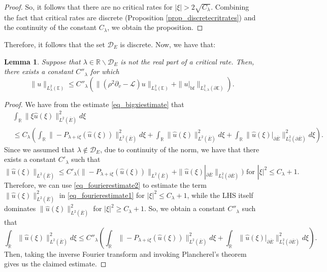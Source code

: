 \documentclass[10pt, a4paper]{article}
\theoremstyle{plain}%
\newtheorem{lem}[theorem]{Lemma}
\theoremstyle{definition}
\numberwithin{figure}{section}
\numberwithin{equation}{section}
\newcommand{\bR}{\mathbb{R}}
\newcommand{\bE}{\mathbb{E}}
\newcommand{\pa}{\partial}
\newcommand{\cL}{\mathcal{L}}
\newcommand{\oE}{{\overline{E}}}
\newcommand{\botf}{\textrm{bf}}
\newcommand{\cD}{\mathcal{D}}
\begin{document}
\begin{proof}
	
	So, it follows that there are no critical rates for $|\xi|>2\sqrt{C_\lambda}$. Combining the fact that critical rates are discrete (Proposition \ref{prop_discretecritrates}) and the continuity of the constant $C_\lambda$, we obtain the proposition. 
\end{proof}
Therefore, it follows that the set $\cD_E$ is discrete. Now, we have that:

\begin{lem}\label{lem_fredholmnoncritical}
	Suppose that $\lambda\in \bR \backslash \cD_E$ is not the real part of a critical rate. Then, there exists a constant $C''_\lambda$ for which \[
	\|u\|_{L^2_{\lambda}(\bE)} \leq C''_\lambda(\|(\rho^2\pa_v - \cL)u\|_{L^2_{\lambda}(\bE)}  +\|u|_{\botf}\|_{L^2_{1,\lambda}(\pa\bE)}).
	\]  
\end{lem}
\begin{proof}
	We have from the estimate \eqref{eq_bigxiestimate} that 
	\begin{equation}\label{eq_fourierestimate1}
		\begin{split}
		&\int_{\bR}\|\xi\hat{u}(\xi)\|^2_{L^2(\oE)}d\xi\\
		&\leq C_\lambda\left(\int_{\bR}\|-P_{\lambda+i\xi}(\hat{u}(\xi))\|^2_{L^2(\oE)}d\xi + \int_{\bR}\|\hat{u}(\xi)\|^2_{L^2(\oE)}d\xi + \int_{\bR}\|\hat{u}(\xi)|_{\pa\oE}\|^2_{L^2_1(\pa\oE)}d\xi\right).
		\end{split}
	\end{equation}
	Since we assumed that $\lambda \not \in \cD_E$, due to continuity of the norm, we have that there exists a constant $C'_\lambda$ such that \begin{equation}\label{eq_fourierestimate2}
		\|\hat{u}(\xi)\|_{L^2(\oE)} \leq C'_\lambda (\|-P_{\lambda+i\xi}(\hat{u}(\xi))\|_{L^2(\oE)} + \|\hat{u}(\xi)|_{\pa\oE}\|_{L^2_1(\pa\oE)}) \textrm{ for } |\xi|^2 \leq C_\lambda+1.
	\end{equation}
	Therefore, we can use \eqref{eq_fourierestimate2} to estimate the term $\|\hat{u}(\xi)\|^2_{L^2(\oE)}$ in \eqref{eq_fourierestimate1} for $|\xi|^2\leq C_{\lambda}+1$, while the LHS itself dominates $\|\hat{u}(\xi)\|^2_{L^2(\oE)}$ for $|\xi|^2\geq C_{\lambda}+1$. So, we obtain a constant $C''_\lambda$ such that \[
	\int_{\bR}\|\hat{u}(\xi)\|^2_{L^2(\oE)}d\xi\leq C''_\lambda\left(\int_{\bR}\|-P_{\lambda+i\xi}(\hat{u}(\xi))\|^2_{L^2(\oE)}d\xi + \int_{\bR}\|\hat{u}(\xi)|_{\pa\oE}\|^2_{L^2_1(\pa\oE)}d\xi\right).
	\]
	Then, taking the inverse Fourier transform and invoking Plancherel's theorem gives us the claimed estimate. 
\end{proof}
\end{document}
